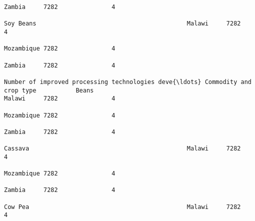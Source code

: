 \documentclass[11pt]{article}
\begin{document}
\begin{Verbatim}[commandchars=\\\{\}]
                                                                                                                                                                                                                 Zambia     7282               4  
                                                                                                                                                              Soy Beans                                          Malawi     7282               4  
                                                                                                                                                                                                                 Mozambique 7282               4  
                                                                                                                                                                                                                 Zambia     7282               4  
                                                                         Number of improved processing technologies deve{\ldots} Commodity and crop type           Beans                                              Malawi     7282               4  
                                                                                                                                                                                                                 Mozambique 7282               4  
                                                                                                                                                                                                                 Zambia     7282               4  
                                                                                                                                                              Cassava                                            Malawi     7282               4  
                                                                                                                                                                                                                 Mozambique 7282               4  
                                                                                                                                                                                                                 Zambia     7282               4  
                                                                                                                                                              Cow Pea                                            Malawi     7282               4  

\end{Verbatim}
\end{document}
